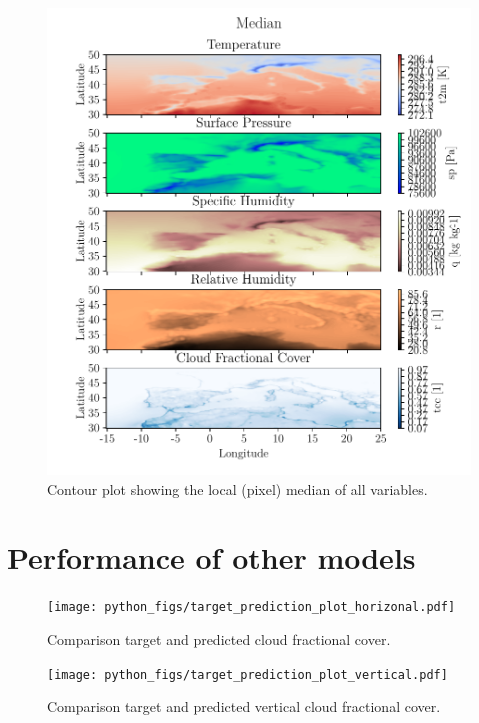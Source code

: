 %


\cleardoublepage
\begin{figure}[ht]
    \centering
    \includegraphics{python_figs/contourplot_all_variables_median.pdf}
    \caption{Contour plot showing the local (pixel) median of all variables.}
    \label{fig:contour_mean_all_vars}
\end{figure}

\chapter{Performance of other models}


\begin{figure}[ht]
    \centering
    \texttt{[image: python\_figs/target\_prediction\_plot\_horizonal.pdf]}
    \caption{Comparison target and predicted cloud fractional cover.}
    \label{fig:target_predict_horizontal}
\end{figure}

\begin{figure}[ht]
    \centering
    \texttt{[image: python\_figs/target\_prediction\_plot\_vertical.pdf]}
    \caption{Comparison target and predicted vertical cloud fractional cover.}
    \label{fig:target_predict_vertical}
\end{figure}


